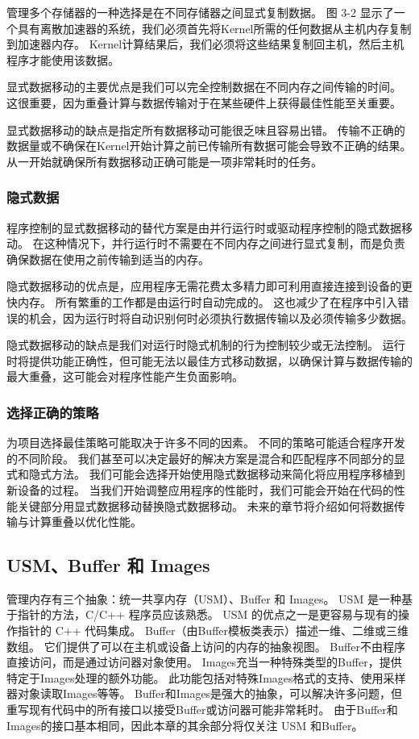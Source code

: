 管理多个存储器的一种选择是在不同存储器之间显式复制数据。 
图 3-2 显示了一个具有离散加速器的系统，我们必须首先将Kernel所需的任何数据从主机内存复制到加速器内存。 
Kernel计算结果后，我们必须将这些结果复制回主机，然后主机程序才能使用该数据。

显式数据移动的主要优点是我们可以完全控制数据在不同内存之间传输的时间。 
这很重要，因为重叠计算与数据传输对于在某些硬件上获得最佳性能至关重要。

显式数据移动的缺点是指定所有数据移动可能很乏味且容易出错。 
传输不正确的数据量或不确保在Kernel开始计算之前已传输所有数据可能会导致不正确的结果。 
从一开始就确保所有数据移动正确可能是一项非常耗时的任务。

\subsubsection{隐式数据}
程序控制的显式数据移动的替代方案是由并行运行时或驱动程序控制的隐式数据移动。 
在这种情况下，并行运行时不需要在不同内存之间进行显式复制，而是负责确保数据在使用之前传输到适当的内存。

隐式数据移动的优点是，应用程序无需花费太多精力即可利用直接连接到设备的更快内存。 
所有繁重的工作都是由运行时自动完成的。 
这也减少了在程序中引入错误的机会，因为运行时将自动识别何时必须执行数据传输以及必须传输多少数据。

隐式数据移动的缺点是我们对运行时隐式机制的行为控制较少或无法控制。 
运行时将提供功能正确性，但可能无法以最佳方式移动数据，以确保计算与数据传输的最大重叠，这可能会对程序性能产生负面影响。

\subsubsection{选择正确的策略}
为项目选择最佳策略可能取决于许多不同的因素。 不同的策略可能适合程序开发的不同阶段。 
我们甚至可以决定最好的解决方案是混合和匹配程序不同部分的显式和隐式方法。 
我们可能会选择开始使用隐式数据移动来简化将应用程序移植到新设备的过程。 
当我们开始调整应用程序的性能时，我们可能会开始在代码的性能关键部分用显式数据移动替换隐式数据移动。 
未来的章节将介绍如何将数据传输与计算重叠以优化性能。

\subsection{USM、Buffer 和 Images}
管理内存有三个抽象：统一共享内存（USM）、Buffer 和 Images。 USM 是一种基于指针的方法，C/C++ 程序员应该熟悉。 
USM 的优点之一是更容易与现有的操作指针的 C++ 代码集成。 Buffer（由Buffer模板类表示）描述一维、二维或三维数组。 
它们提供了可以在主机或设备上访问的内存的抽象视图。 Buffer不由程序直接访问，而是通过访问器对象使用。 
Images充当一种特殊类型的Buffer，提供特定于Images处理的额外功能。 
此功能包括对特殊Images格式的支持、使用采样器对象读取Images等等。 
Buffer和Images是强大的抽象，可以解决许多问题，但重写现有代码中的所有接口以接受Buffer或访问器可能非常耗时。 
由于Buffer和Images的接口基本相同，因此本章的其余部分将仅关注 USM 和Buffer。

